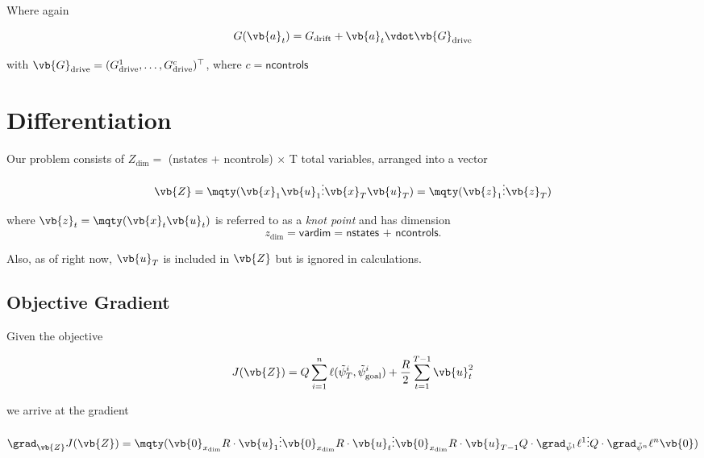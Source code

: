 \documentclass{article}
\newcommand{\isopsi}{\tilde \psi}
\begin{document}
Where again 

$$
G(\vb{a}_t) = G_{\text{drift}} + \vb{a}_t \vdot \vb{G}_{\text{drive}}
$$

with $\vb{G}_{\text{drive}} = (G^1_{\text{drive}}, \dots, G^c_{\text{drive}})^\top$, where $c = \textsf{ncontrols}$

\newpage
\section{Differentiation}

Our problem consists of $Z_{\dim}=$ \textsf{(nstates + ncontrols) $\times$ T} total variables, arranged into a vector

\begin{equation}
  \vb{Z} = \mqty(
    \vb{x}_1 \\
    \vb{u}_1 \\
    \vdots \\
    \vb{x}_T \\
    \vb{u}_T \\
  ) =
  \mqty(
    \vb{z}_1 \\
    \vdots \\ 
    \vb{z}_T
  )
\end{equation}

where $\vb{z}_t = \mqty( \vb{x}_t \\ \vb{u}_t)$ is referred to as a \textit{knot point} and has dimension 
$$
z_{\dim} = \textsf{vardim} = \textsf{nstates + ncontrols}.
$$ 

Also, as of right now, $\vb{u}_T$ is included in $\vb{Z}$ but is ignored in calculations. 

\subsection{Objective Gradient}

Given the objective

\begin{equation}
  J(\vb{Z}) = Q \sum_{i=1}^n \ell(\isopsi_T^i, \isopsi_\text{goal}^i) + \frac{R}{2} \sum_{t=1}^{T-1} \vb{u}_t^2 
\end{equation}

we arrive at the gradient

\begin{equation}
  \grad_{\vb{Z}} J(\vb{Z}) = \mqty(
    \vb{0}_{x_{\dim}} \\
    R \cdot \vb{u}_1 \\
    \vdots \\
    \vb{0}_{x_{\dim}} \\
    R \cdot \vb{u}_t \\
    \vdots \\
    \vb{0}_{x_{\dim}} \\
    R \cdot \vb{u}_{T-1} \\
    Q \cdot \grad_{\isopsi^1} \ell^1 \\
    \vdots \\
    Q \cdot \grad_{\isopsi^n} \ell^n \\
    \vb{0}
  ) 
\end{equation}
\end{document}

